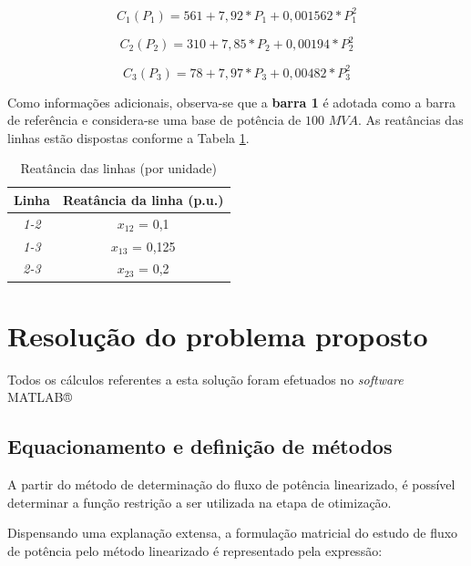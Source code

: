		\begin{equation}
			C_1(P_1) = 561 + 7,92*P_1 + 0,001562*P_1^2
			\label{eq:custo1}
		\end{equation}
		
			\begin{equation}
			C_2(P_2) = 310 + 7,85*P_2 + 0,00194*P_2^2
			\label{eq:custo2}
		\end{equation}
		
			\begin{equation}
			C_3(P_3) = 78 + 7,97*P_3 + 0,00482*P_3^2
			\label{eq:custo3}
		\end{equation}
		
		Como informações adicionais, observa-se que a \textbf{barra 1} é adotada como a barra de referência e considera-se uma base de potência de $100$ $MVA$. As reatâncias das linhas estão dispostas conforme a Tabela \ref{tab:reat1}.
		
		
\begin{table}[!h]
\centering
\caption{Reatância das linhas (por unidade)}
\label{tab:reat1}
\begin{tabular}{|c|c|}
\hline
\textbf{Linha} & \textbf{Reatância da linha (p.u.)} \\ \hline
\textit{1-2} & $x_{12}$ = 0,1 \\ \hline
\textit{1-3} & $x_{13}$ = 0,125 \\ \hline
\textit{2-3} & $x_{23}$ = 0,2 \\ \hline
\end{tabular}
\end{table}

\section{Resolução do problema proposto}

	Todos os cálculos referentes a esta solução foram efetuados no \textit{software} MATLAB®
	
	\subsection{Equacionamento e definição de métodos}
	
	A partir do método de determinação do fluxo de potência linearizado, é possível determinar a função restrição a ser utilizada na etapa de otimização.
	
	Dispensando uma explanação extensa, a formulação matricial do estudo de fluxo de potência pelo método linearizado é representado pela expressão:
	
